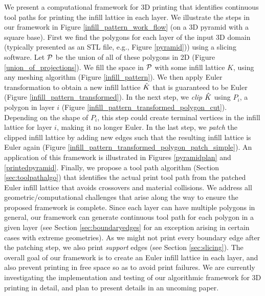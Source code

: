 We present a computational framework for 3D printing that identifies continuous tool paths for printing the infill lattice in each layer. We illustrate the steps in our framework in Figure \ref{infill_pattern_work_flow} (on a 3D pyramid with a square base).
First we find the polygons for each layer of the input 3D domain (typically presented as an STL file, e.g., Figure \ref{pyramid})) using a slicing software.
Let $\mathcal{P}$ be the union of all of these polygons in 2D (Figure \ref{union_of_projections}). 
We fill the space in $\mathcal{P}$ with some infill lattice $K$, using any meshing algorithm (Figure \ref{infill_pattern}).
We then apply Euler transformation to obtain a new infill lattice $\hat{K}$ that is guaranteed to be Euler (Figure \ref{infill_pattern_transformed}).
In the next step, we \emph{clip} $\hat{K}$ using $P_i$, a polygon in layer $i$ (Figure \ref{infill_pattern_transformed_polygon_cut}).
Depending on the shape of $P_i$, this step could create terminal vertices in the infill lattice for layer $i$, making it no longer Euler.
In the last step, we \emph{patch} the clipped infill lattice by adding new edges such that the resulting infill lattice is Euler again (Figure \ref{infill_pattern_transformed_polygon_patch_simple}).
An application of this framework is illustrated in Figures \ref{pyramidplan} and \ref{printedpyramid}.
Finally, we propose a tool path algorithm (Section \ref{sec:toolpathalgo}) that identifies the actual print tool path from the patched Euler infill lattice that avoids crossovers and material collisions.
We address all geometric/computational challenges that arise along the way to ensure the proposed framework is complete.
Since each layer can have multiple polygons in general, our framework can generate continuous tool path for each polygon in a given layer (see Section \ref{sec:boundaryedges} for an exception arising in certain cases with extreme geometries).
As we might not print every boundary edge after the patching step, we also print \emph{support} edges (see Section \ref{sec:slicing}).
The overall goal of our framework is to create an Euler infill lattice in each layer, and also prevent printing in free space so as to avoid print failures.
We are currently investigating the implementation and testing of our algorithmic framework for 3D printing in detail, and plan to present details in an uncoming paper.

